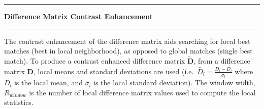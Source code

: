 \noindent\rule{\textwidth}{1pt}
\indent \textbf{Difference Matrix Contrast Enhancement}
\noindent\rule{\textwidth}{1pt}
\smallskip
\parbox{\textwidth}{The contrast enhancement of the difference matrix aids searching for local best matches (best in local neighborhood),  as opposed to global matches (single best match). To produce a contrast enhanced difference matrix $\tilde{\mathbf{D}}$, from a difference matrix $\mathbf{D}$, local means and standard deviations are used (i.e.\ $\tilde{D_l}=\frac{D_l - \overline{D_l}}{\sigma_l}$ where $\overline{D_l}$ is the local mean, and $\sigma_l$ is the local standard deviation). The window width, $R_{window}$ is the number of local difference matrix values used to compute the local statistics.}
\smallskip

